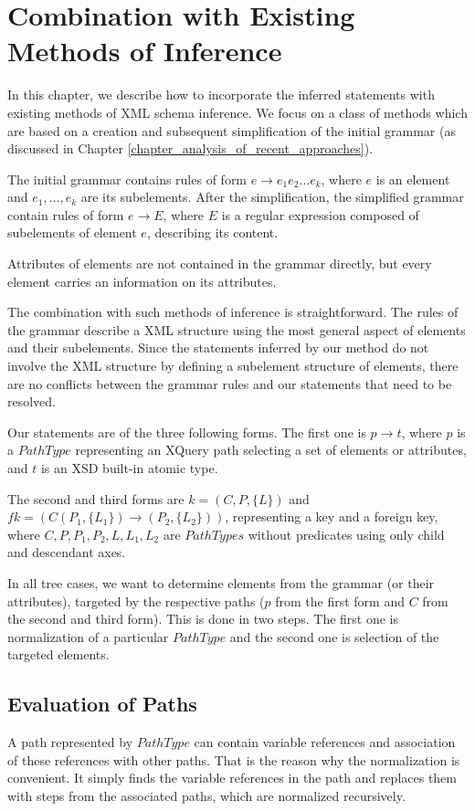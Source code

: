 \chapter{Combination with Existing Methods of Inference}
In this chapter, we describe how to incorporate the inferred statements with existing methods of XML schema inference. We focus on a class of methods which are based on a creation and subsequent simplification of the initial grammar (as discussed in Chapter \ref{chapter_analysis_of_recent_approaches}).

The initial grammar contains rules of form $e \rightarrow e_1e_2\dots e_k$, where $e$ is an element and $e_1, \dots , e_k$ are its subelements. After the simplification, the simplified grammar contain rules of form $e \rightarrow E$, where $E$ is a regular expression composed of subelements of element $e$, describing its content.

Attributes of elements are not contained in the grammar directly, but every element carries an information on its attributes.

The combination with such methods of inference is straightforward. The rules of the grammar describe a XML structure using the most general aspect of elements and their subelements. Since the statements inferred by our method do not involve the XML structure by defining a subelement structure of elements, there are no conflicts between the grammar rules and our statements that need to be resolved.

Our statements are of the three following forms. The first one is $p \rightarrow t$, where $p$ is a $PathType$ representing an XQuery path selecting a set of elements or attributes, and $t$ is an XSD built-in atomic type.

The second and third forms are $k = (C,P,\{L\})$ and $fk = (C(P_1,\{L_1\}) \rightarrow (P_2,\{L_2\}))$, representing a key and a foreign key, where $C,P,P_1,P_2,L,L_1,L_2$ are $PathTypes$ without predicates using only child and descendant axes.

In all tree cases, we want to determine elements from the grammar (or their attributes), targeted by the respective paths ($p$ from the first form and $C$ from the second and third form). This is done in two steps. The first one is normalization of a particular $PathType$ and the second one is selection of the targeted elements.

\section{Evaluation of Paths}
A path represented by $PathType$ can contain variable references and association of these references with other paths. That is the reason why the normalization is convenient. It simply finds the variable references in the path and replaces them with steps from the associated paths, which are normalized recursively.

